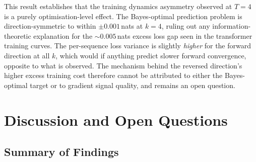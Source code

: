 \documentclass[11pt]{article}
\newcommand{\claude}[1]{{\color{red}\textsf{#1}}}
\begin{document}
\claude{This result establishes that the training dynamics asymmetry observed at $T = 4$ is a purely optimisation-level effect.  The Bayes-optimal prediction problem is direction-symmetric to within $\pm 0.001$\,nats at $k = 4$, ruling out any information-theoretic explanation for the $\sim 0.005$\,nats excess loss gap seen in the transformer training curves.  The per-sequence loss variance is slightly \emph{higher} for the forward direction at all $k$, which would if anything predict slower forward convergence, opposite to what is observed.  The mechanism behind the reversed direction's higher excess training cost therefore cannot be attributed to either the Bayes-optimal target or to gradient signal quality, and remains an open question.}

\section{Discussion and Open Questions}\label{sec:open}

\subsection{Summary of Findings}
\end{document}
